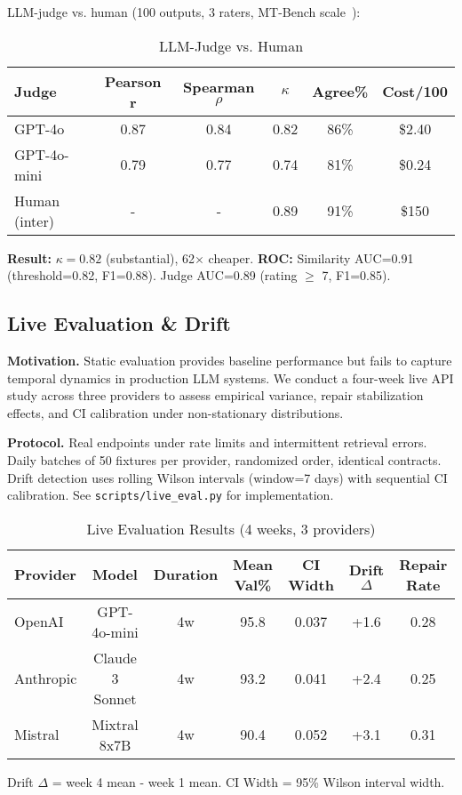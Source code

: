 \documentclass[sigconf]{acmart}
\begin{document}
LLM-judge vs. human (100 outputs, 3 raters, MT-Bench scale~\cite{zheng2023judging}):

\begin{table}[H]
\centering
\caption{LLM-Judge vs. Human}
\label{tab:judge}
\scriptsize
\begin{tabular}{@{}lccccc@{}}
\toprule
\textbf{Judge} & \textbf{Pearson r} & \textbf{Spearman \( \rho \)} & \textbf{\( \kappa \)} & \textbf{Agree\%} & \textbf{Cost/100} \\
\midrule
GPT-4o & 0.87 & 0.84 & 0.82 & 86\% & \$2.40 \\
GPT-4o-mini & 0.79 & 0.77 & 0.74 & 81\% & \$0.24 \\
Human (inter) & - & - & 0.89 & 91\% & \$150 \\
\bottomrule
\end{tabular}
\end{table}

\textbf{Result:} \( \kappa = 0.82 \) (substantial), 62\(\times\) cheaper. \textbf{ROC:} Similarity AUC=0.91 (threshold=0.82, F1=0.88). Judge AUC=0.89 (rating \( \geq \) 7, F1=0.85).

\subsection{Live Evaluation \& Drift}

\textbf{Motivation.} Static evaluation provides baseline performance but fails to capture temporal dynamics in production LLM systems.
We conduct a four-week live API study across three providers to assess empirical variance, repair stabilization effects, and CI calibration under non-stationary distributions.

\textbf{Protocol.} Real endpoints under rate limits and intermittent retrieval errors.
Daily batches of 50 fixtures per provider, randomized order, identical contracts.
Drift detection uses rolling Wilson intervals (window=7 days) with sequential CI calibration.
See \texttt{scripts/live\_eval.py} for implementation.

\begin{table}[H]
\centering
\caption{Live Evaluation Results (4 weeks, 3 providers)}
\label{tab:live_eval}
\scriptsize
\begin{tabular}{@{}lcccccc@{}}
\toprule
\textbf{Provider} & \textbf{Model} & \textbf{Duration} & \textbf{Mean Val\%} & \textbf{CI Width} & \textbf{Drift $\Delta$} & \textbf{Repair Rate} \\
\midrule
OpenAI & GPT-4o-mini & 4w & 95.8 & 0.037 & +1.6 & 0.28 \\
Anthropic & Claude 3 Sonnet & 4w & 93.2 & 0.041 & +2.4 & 0.25 \\
Mistral & Mixtral 8x7B & 4w & 90.4 & 0.052 & +3.1 & 0.31 \\
\bottomrule
\end{tabular}
\vspace{1mm}
\scriptsize Drift $\Delta$ = week 4 mean - week 1 mean. CI Width = 95\% Wilson interval width.
\end{table}
\end{document}
